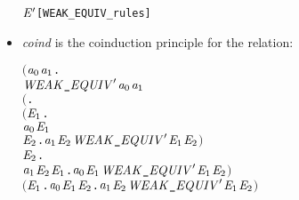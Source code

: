 \begin{itemize}
\begin{alltt}
    \HOLSymConst{\HOLTokenWeakEQ} \ensuremath{\HOLFreeVar{E}\sp{\prime}}\hfill{[WEAK_EQUIV_rules]}
\end{alltt}
\item \emph{coind} is the coinduction principle for the relation:
\begin{alltt}
\HOLTokenTurnstile{} \ensuremath{(}\HOLSymConst{\HOLTokenForall{}}\ensuremath{\HOLBoundVar{a}\sb{\mathrm{0}}} \ensuremath{\HOLBoundVar{a}\sb{\mathrm{1}}}.
        \ensuremath{\HOLFreeVar{WEAK\HOLTokenUnderscore{}EQUIV}\sp{\prime}} \ensuremath{\HOLBoundVar{a}\sb{\mathrm{0}}} \ensuremath{\HOLBoundVar{a}\sb{\mathrm{1}}} \HOLSymConst{\HOLTokenImp{}}
        \ensuremath{(}\HOLSymConst{\HOLTokenForall{}}.
             \ensuremath{(}\HOLSymConst{\HOLTokenForall{}}\ensuremath{\HOLBoundVar{E}\sb{\mathrm{1}}}.
                  \ensuremath{\HOLBoundVar{a}\sb{\mathrm{0}}} \HOLTokenTransBegin{} \HOLTokenTransEnd \ensuremath{\HOLBoundVar{E}\sb{\mathrm{1}}} \HOLSymConst{\HOLTokenImp{}}
                  \HOLSymConst{\HOLTokenExists{}}\ensuremath{\HOLBoundVar{E}\sb{\mathrm{2}}}. \ensuremath{\HOLBoundVar{a}\sb{\mathrm{1}}} \HOLTokenWeakTransBegin{} \HOLTokenWeakTransEnd \ensuremath{\HOLBoundVar{E}\sb{\mathrm{2}}} \HOLSymConst{\HOLTokenConj{}} \ensuremath{\HOLFreeVar{WEAK\HOLTokenUnderscore{}EQUIV}\sp{\prime}} \ensuremath{\HOLBoundVar{E}\sb{\mathrm{1}}} \ensuremath{\HOLBoundVar{E}\sb{\mathrm{2}}}\ensuremath{)} \HOLSymConst{\HOLTokenConj{}}
             \HOLSymConst{\HOLTokenForall{}}\ensuremath{\HOLBoundVar{E}\sb{\mathrm{2}}}.
                 \ensuremath{\HOLBoundVar{a}\sb{\mathrm{1}}} \HOLTokenTransBegin{} \HOLTokenTransEnd \ensuremath{\HOLBoundVar{E}\sb{\mathrm{2}}} \HOLSymConst{\HOLTokenImp{}} \HOLSymConst{\HOLTokenExists{}}\ensuremath{\HOLBoundVar{E}\sb{\mathrm{1}}}. \ensuremath{\HOLBoundVar{a}\sb{\mathrm{0}}} \HOLTokenWeakTransBegin{} \HOLTokenWeakTransEnd \ensuremath{\HOLBoundVar{E}\sb{\mathrm{1}}} \HOLSymConst{\HOLTokenConj{}} \ensuremath{\HOLFreeVar{WEAK\HOLTokenUnderscore{}EQUIV}\sp{\prime}} \ensuremath{\HOLBoundVar{E}\sb{\mathrm{1}}} \ensuremath{\HOLBoundVar{E}\sb{\mathrm{2}}}\ensuremath{)} \HOLSymConst{\HOLTokenConj{}}
        \ensuremath{(}\HOLSymConst{\HOLTokenForall{}}\ensuremath{\HOLBoundVar{E}\sb{\mathrm{1}}}. \ensuremath{\HOLBoundVar{a}\sb{\mathrm{0}}} \HOLTokenTransBegin\HOLSymConst{\ensuremath{\tau}}\HOLTokenTransEnd \ensuremath{\HOLBoundVar{E}\sb{\mathrm{1}}} \HOLSymConst{\HOLTokenImp{}} \HOLSymConst{\HOLTokenExists{}}\ensuremath{\HOLBoundVar{E}\sb{\mathrm{2}}}. \ensuremath{\HOLBoundVar{a}\sb{\mathrm{1}}} \HOLSymConst{\HOLTokenEPS} \ensuremath{\HOLBoundVar{E}\sb{\mathrm{2}}} \HOLSymConst{\HOLTokenConj{}} \ensuremath{\HOLFreeVar{WEAK\HOLTokenUnderscore{}EQUIV}\sp{\prime}} \ensuremath{\HOLBoundVar{E}\sb{\mathrm{1}}} \ensuremath{\HOLBoundVar{E}\sb{\mathrm{2}}}\ensuremath{)} \HOLSymConst{\HOLTokenConj{}}

\end{alltt}
\end{itemize}
